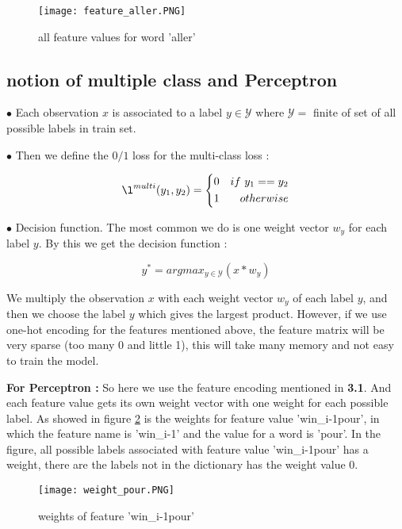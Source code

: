 \documentclass{article}
\def\YY{{\mathcal{Y}}}
\begin{document}
\begin{figure}[ht]
\centering
\texttt{[image: feature\_aller.PNG]}
\caption{all feature values for word 'aller'}
\label{figure1}
\end{figure}

\subsection{notion of multiple class and Perceptron}
$\bullet$ Each observation $x$ is associated to a label $y \in \YY$ where $\YY = $ finite of set of all possible labels in train set. 

$\bullet$ Then we define the $0/1$ loss for the multi-class loss : 

\begin{equation}
\l^{multi}(y_1, y_2) = \left\{
\begin{aligned}
0 & & if\ y_1 == y_2\\
1 & &otherwise
\end{aligned}
\right.
\end{equation}

$\bullet$ Decision function. The most common we do is one weight vector $w_y$ for each label $y$. By this we get the decision function :

\begin{equation}
y^* = argmax_{y \in \YY} (x*w_y)
\end{equation}

We multiply the observation $x$ with each weight vector $w_y$ of each label $y$, and then we choose the label $y$ which gives the largest product. However, if we use one-hot encoding for the features mentioned above, the feature matrix will be very sparse (too many 0 and little 1), this will take many memory and not easy to train the model.

\textbf{For Perceptron : } So here we use the feature encoding mentioned in \textbf{3.1}. And each feature value gets its own weight vector with one weight for each possible label. As showed in figure \ref{figure2} is the weights for feature value 'win\_i-1pour', in which the feature name is 'win\_i-1' and the value for a word is 'pour'. In the figure, all possible labels associated with feature value 'win\_i-1pour' has a weight, there are the labels not in the dictionary has the weight value 0.

\begin{figure}[ht]
\centering
\texttt{[image: weight\_pour.PNG]}
\caption{weights of feature 'win\_i-1pour'}
\label{figure2}
\end{figure}
\end{document}
